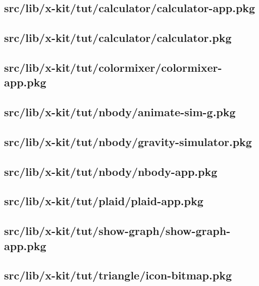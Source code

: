 \subsection{src/lib/x-kit/tut/calculator/calculator-app.pkg}


\subsection{src/lib/x-kit/tut/calculator/calculator.pkg}


\subsection{src/lib/x-kit/tut/colormixer/colormixer-app.pkg}


\subsection{src/lib/x-kit/tut/nbody/animate-sim-g.pkg}


\subsection{src/lib/x-kit/tut/nbody/gravity-simulator.pkg}


\subsection{src/lib/x-kit/tut/nbody/nbody-app.pkg}


\subsection{src/lib/x-kit/tut/plaid/plaid-app.pkg}


\subsection{src/lib/x-kit/tut/show-graph/show-graph-app.pkg}


\subsection{src/lib/x-kit/tut/triangle/icon-bitmap.pkg}


